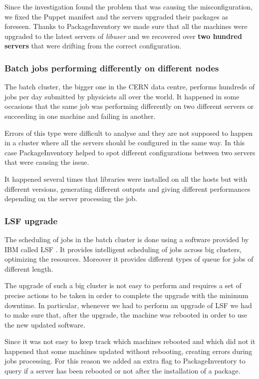 Since the investigation found the problem that was causing the
misconfiguration, we fixed the Puppet manifest and the servers upgraded
their packages as foreseen. Thanks to PackageInventory we made sure that
all the machines were upgraded to the latest servers of \textit{libuser}
and we recovered over \textbf{two hundred servers} that were drifting
from the correct configuration.

\subsubsection{Batch jobs performing differently on different nodes}

The batch cluster, the bigger one in the CERN data centre, performs
hundreds of jobs per day submitted by physicists all over the world. It
happened in some occasions that the same job was performing differently on
two different servers or succeeding in one machine and failing in another.

Errors of this type were difficult to analyse and they are not supposed to
happen in a cluster where all the servers should be configured in the same
way. In this case PackageInventory helped to spot different configurations
between two servers that were causing the issue.

It happened several times that libraries were installed on all the hosts but
with different versions, generating different outputs and giving different
performances depending on the server processing the job.

\subsubsection{LSF upgrade}

The scheduling of jobs in the batch cluster is done using a software
provided by IBM called LSF \cite{ibm-lsf}. It provides intelligent
scheduling of jobs across big clusters, optimizing the resources.
Moreover it provides different types of queue for jobs of different
length.

The upgrade of such a big cluster is not easy to perform and requires
a set of precise actions to be taken in order to complete the upgrade
with the minimum downtime. In particular, whenever we had to perform an
upgrade of LSF we had to make sure that, after the upgrade, the machine
was rebooted in order to use the new updated software.

Since it was not easy to keep track which machines rebooted and which
did not it happened that some machines updated without rebooting,
creating errors during jobs processing. For this reason we added an
extra flag to PackageInventory to query if a server has been rebooted or
not after the installation of a package.
